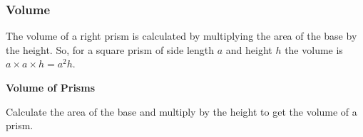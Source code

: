             \subsubsection{ Volume}
            \nopagebreak
            \label{m39357*id62951}The volume of a right prism is calculated by multiplying the area of the base by the height. So, for a square prism of side length $a$ and height \begin{math}h\end{math} the volume is \begin{math}a\ensuremath{\times}a\ensuremath{\times}h={a}^{2}h\end{math}.\par 
        \label{m39357*id63000}
          \textbf{Volume of Prisms}
        \par 
        \label{m39357*id63006}Calculate the area of the base and multiply by the height to get the volume of a prism.\par 
\label{m39357*eip-491}\vspace{.5cm} 
      
